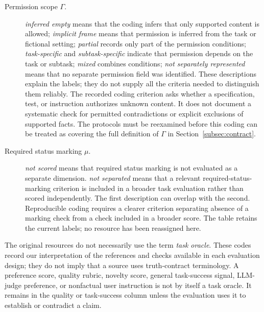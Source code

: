 \documentclass{clv2025}
\begin{document}
\begin{description}
  \item[Permission scope $\Gamma$.]
  \emph{inferred empty} means that the coding infers that only supported
  content is allowed;
  \emph{implicit frame} means that permission is inferred from the task or
  fictional setting;
  \emph{partial} records only part of the permission conditions;
  \emph{task-specific} and \emph{subtask-specific} indicate that permission
  depends on the task or subtask;
  \emph{mixed} combines conditions;
  \emph{not separately represented} means that no separate permission field
  was identified.
  These descriptions explain the labels; they do not supply all the criteria
  needed to distinguish them reliably. The recorded coding criterion asks
  whether a specification, test, or instruction authorizes unknown content.
  It does not document a systematic check for permitted contradictions or
  explicit exclusions of supported facts. The protocols must be reexamined
  before this coding can be treated as covering the full definition of
  $\Gamma$ in Section~\ref{subsec:contract}.

  \item[Required status marking $\mu$.]
  \emph{not scored} means that required status marking is not evaluated as a
  separate dimension.
  \emph{not separated} means that a relevant required-status-marking criterion
  is included in a broader task evaluation rather than scored independently.
  The first description can overlap with the second. Reproducible coding
  requires a clearer criterion separating absence of a marking check from
  a check included in a broader score. The table retains the current labels;
  no resource has been reassigned here.
\end{description}

The original resources do not necessarily use the term \emph{task oracle}.
These codes record our interpretation of the references and checks
available in each evaluation design; they do not imply that a source uses
truth-contract terminology.
A preference score, quality rubric, novelty score, general task-success
signal, LLM-judge preference, or nonfactual user instruction is not by itself
a task oracle.
It remains in the quality or task-success column unless the evaluation uses it
to establish or contradict a claim.
\end{document}

